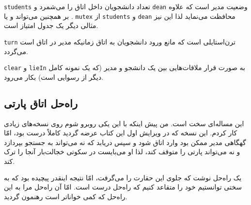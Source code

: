 \documentclass{book}
\newcommand{\clearemptydoublepage}{\newpage\cleardoublepage}
\begin{document}
    {\tt students}
    تعداد دانشجویان داخل اتاق را می‌شمرد و {\tt dean}  وضعیت مدیر است که علاوه بر  
    همچنین می‌تواند  و یا . 
    {\tt mutex}
    از  {\tt students} و {\tt dean} محافظت می‌نماید لذا این نیز مثالی دیگر یک جدول امتیاز است. 
    

    {\tt turn}
    ترن‌استایلی است که مانع ورود دانشجویان  به اتاق زمانیکه مدیر در اتاق است می‌گردد. 

    {\tt clear} و {\tt lieIn}
    به صورت قرار ملاقات‌هایی بین  یک دانشجو و مدیر (که یک نمونه کامل دیگر از رسوایی است)  بکار می‌رود. 


\clearemptydoublepage
\subsection{راه‌حل اتاق پارتی}

    این مساله‌ای  سخت است. من پیش اینکه با این یکی روبرو شوم روی نسخه‌های زیادی کار کردم. این نسخه که در ویرایش اول این کتاب عرضه گردید 
    کاملاً درست بود، امّا گهگاهی مدیر ممکن بود وارد اتاق شود و سپس دریابد که نه می‌تواند به جستجو بپردازد و نه می‌تواند پارتی را متوقف کند، لذا او می‌بایست 
    در سکوتی خجالت‌بار آنجا را ترک کند. 

    یک راه‌حل نوشت که جلوی این حقارت را می‌گرفت، امّا نتیجه اینقدر پیچیده بود که به سختی توانستیم خود را متقاعد کنیم که راه‌حل درست است. 
    امّا آن راه‌حل مرا به این راه‌حل که کمی خواناتر است رهنمون گردید. 
\end{document}
